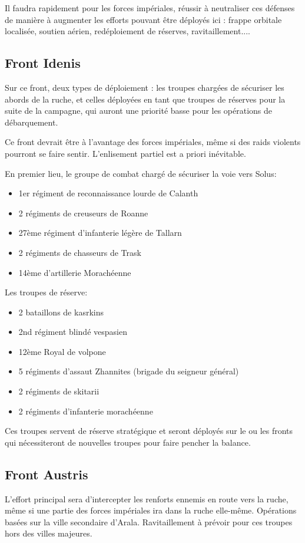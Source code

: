 \documentclass[10pt,a4paper]{book}
\begin{document}
Il faudra rapidement pour les forces impériales, réussir à neutraliser ces défenses de manière à augmenter les efforts pouvant être déployés ici : frappe orbitale localisée, soutien aérien, redéploiement de réserves, ravitaillement....
\subsection{Front Idenis}
Sur ce front, deux types de déploiement : les troupes chargées de sécuriser les abords de la ruche, et celles déployées en tant que troupes de réserves pour la suite de la campagne, qui auront une priorité basse pour les opérations de débarquement.

Ce front devrait être à l'avantage des forces impériales, même si des raids violents pourront se faire sentir. L'enlisement partiel est a priori inévitable.

En premier lieu, le groupe de combat chargé de sécuriser la voie vers Solus:
\begin{itemize}
\item 1er régiment de reconnaissance lourde de Calanth
\item 2 régiments de creuseurs de Roanne
\item 27ème régiment d'infanterie légère de Tallarn
\item 2 régiments de chasseurs de Trask
\item 14ème d'artillerie Morachéenne
\end{itemize}

Les troupes de réserve:
\begin{itemize}
\item 2 bataillons de kasrkins
\item 2nd régiment blindé vespasien
\item 12ème Royal de volpone 
\item 5 régiments d'assaut Zhannites (brigade du seigneur général)
\item 2 régiments de skitarii
\item 2 régiments d'infanterie morachéenne
\end{itemize}
Ces troupes servent de réserve stratégique et seront déployés sur le ou les fronts qui nécessiteront de nouvelles troupes pour faire pencher la balance.
\subsection{Front Austris}
L'effort principal sera d'intercepter les renforts ennemis en route vers la ruche, même si une partie des forces impériales ira dans la ruche elle-même. Opérations basées sur la ville secondaire d'Arala. Ravitaillement à prévoir pour ces troupes hors des villes majeures.
\end{document}
